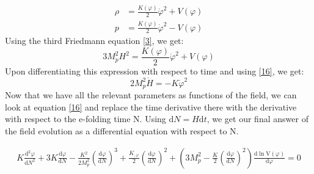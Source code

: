 \documentclass[aps,prd,reprint,preprintnumbers,showpacs,floatfix,nofootinbib,superscript address]{revtex4-2}
\begin{document}
\begin{align}   \label{18}
    \rho &= \frac{K(\varphi)}{2} \dot{\varphi}^2 + V(\varphi) \nonumber \\
    p &= \frac{K(\varphi)}{2} \dot{\varphi}^2 - V(\varphi)
\end{align}
Using the third Friedmann equation \ref{3}, we get:
\begin{equation}    \label{19}
    3 M_p^2H^2 = \frac{K(\varphi)}{2} \dot{\varphi}^2 + V(\varphi)
\end{equation}
Upon differentiating this expression with respect to time and using \ref{16}, we get:
\begin{equation} \label{20}
    2 M_p^2 \dot{H} = -  K \dot{\varphi}^2
\end{equation}
Now that we have all the relevant parameters as functions of the field, we can look at equation \ref{16} and replace the time derivative there with the derivative with respect to the e-folding time N. Using $\text{d}N = H \text{d}t$, we get our final answer of the field evolution as a differential equation with respect to N.
\begin{widetext}
\begin{subequations}
\begin{align}\label{21}
    K\frac{\text{d}^2\varphi}{\text{d}N^2} +3 K \frac{\text{d}\varphi}{\text{d}N}  - \frac{K^2}{2M_p^2} \left(\frac{\text{d}\varphi}{\text{d}N} \right)^3  +  \frac{K_{,\varphi}}{2}  \left(\frac{\text{d}\varphi}{\text{d}N} \right)^2 +  \left( 3 M_p^2 - \frac{K}{2} \left(\frac{\text{d}\varphi}{\text{d}N} \right)^2 \right) \frac{\text{d}\ln \text{V}(\varphi)}{\text{d} \varphi} = 0    
\end{align}
\end{subequations}
\end{widetext}
\end{document}
